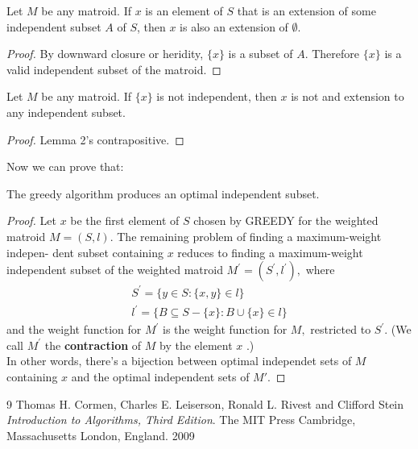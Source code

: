 \documentclass[12pt]{article}
\newenvironment{lemma}[2][Lemma]{\begin{trivlist}
		\item[\hskip \labelsep {\bfseries #1}\hskip \labelsep {\bfseries #2.}]}{\end{trivlist}}
\begin{document}
	\begin{lemma}{2}
		Let $M$ be any matroid. If $x$ is an element of $S$ that is an extension of some independent subset $A$ of $S$, then $x$ is also an extension of $\emptyset$.
	\end{lemma}
	\begin{proof}
		By downward closure or heridity, $\{x\}$ is a subset of $A$. Therefore $\{x\}$ is a valid independent subset of the matroid.
	\end{proof}
	
	\begin{lemma}{3}
		Let $M$ be any matroid. If $\{x\}$ is not independent, then $x$ is not and extension to any independent subset.
	\end{lemma}
	\begin{proof}
		Lemma 2's contrapositive.
	\end{proof}
	Now we can prove that:
	\begin{lemma}{4}
		The greedy algorithm produces an optimal independent subset.
	\end{lemma}
	\begin{proof}
		Let $x$ be the first element of $S$ chosen by GREEDY for the weighted matroid
		$M = ( S , l ) .$ The remaining problem of finding a maximum-weight indepen-
		dent subset containing $x$ reduces to finding a maximum-weight independent subset
		of the weighted matroid $M ^ { \prime } = \left( S ^ { \prime } , l ^ { \prime } \right) ,$ where
		$$\begin{array} { l } { S ^ { \prime } = \{ y \in S : \{ x , y \} \in l \} } \\ { l ^ { \prime } = \{ B \subseteq S - \{ x \} : B \cup \{ x \} \in l \} } \end{array}$$
		and the weight function for $M ^ { \prime }$ is the weight function for $M ,$ restricted to $S ^ { \prime } .$ (We call $M ^ { \prime }$ the \textbf{contraction} of $M$ by the element $x$ .)\\
		\newline
		In other words, there's a bijection between optimal independet sets of $M$ containing $x$ and the optimal independent sets of $M'$.
	\end{proof}


\medskip
\begin{thebibliography}{9}
	 Thomas H. Cormen, Charles E. Leiserson, Ronald L. Rivest and Clifford Stein 
	 \textit{Introduction to Algorithms, Third Edition}. The MIT Press
	 Cambridge, Massachusetts London, England. 2009
\end{thebibliography}
\end{document}

